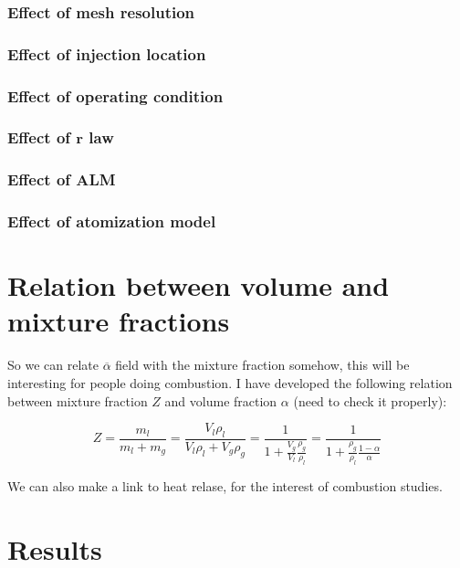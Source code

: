 \subsubsection*{Effect of mesh resolution}

\subsubsection*{Effect of injection location}

\subsubsection*{Effect of operating condition}

\subsubsection*{Effect of $\textbf{r}$ law}

\subsubsection*{Effect of ALM}

\subsubsection*{Effect of atomization model}


\clearpage


\section{Relation between volume and mixture fractions}

So we can relate $\overline{\alpha}$ field with the mixture fraction somehow, this will be interesting for people doing combustion. I have developed the following relation between mixture fraction $Z$ and volume fraction $\alpha$ (need to check it properly):

\begin{equation}
Z = \frac{m_l}{m_l + m_g} = \frac{V_l \rho_l}{V_l \rho_l + V_g \rho_g} = \frac{1}{1 + \frac{V_g}{V_l} \frac{\rho_g}{\rho_l}} = \frac{1}{1 + \frac{\rho_g}{\rho_l} \frac{1 - \alpha}{\alpha}}
\end{equation}


We can also make a link to heat relase, for the interest of combustion studies.




\section{Results}


